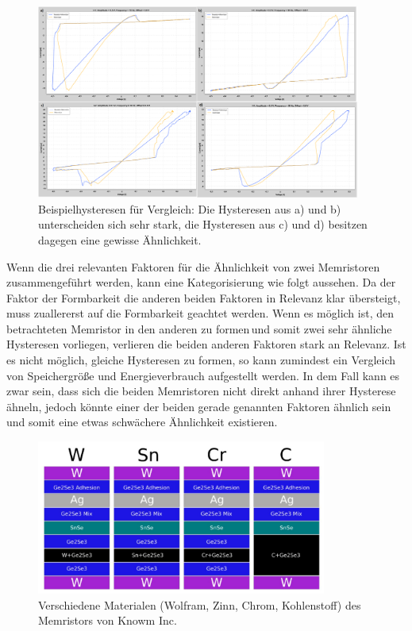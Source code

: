 \begin{figure}
  \centering
  \includegraphics[width=0.95\textwidth]{images/Hysteresen_Vergleich}
  \caption{Beispielhysteresen für Vergleich: Die Hysteresen aus a) und b) unterscheiden sich sehr stark, die Hysteresen aus c) und d) besitzen dagegen eine gewisse Ähnlichkeit.}
  \label{fig:Hysteresenvergleich}
\end{figure}
Wenn die drei relevanten Faktoren für die Ähnlichkeit von zwei Memristoren zusammengeführt werden, kann eine Kategorisierung wie folgt aussehen. Da der Faktor der Formbarkeit die anderen beiden Faktoren in Relevanz klar übersteigt, muss zuallererst auf die Formbarkeit geachtet werden. Wenn es möglich ist, den betrachteten Memristor in den anderen zu \glqq formen\grqq\,und somit zwei sehr ähnliche Hysteresen vorliegen, verlieren die beiden anderen Faktoren stark an Relevanz. Ist es nicht möglich, gleiche Hysteresen zu formen, so kann zumindest ein Vergleich von Speichergröße und Energieverbrauch aufgestellt werden. In dem Fall kann es zwar sein, dass sich die beiden Memristoren nicht direkt anhand ihrer Hysterese ähneln, jedoch könnte einer der beiden gerade genannten Faktoren ähnlich sein und somit eine etwas schwächere Ähnlichkeit existieren.

\begin{figure}
  \centering
  \includegraphics[width=0.85\textwidth]{images/Materialien.jpg}
  \caption{Verschiedene Materialen (Wolfram, Zinn, Chrom, Kohlenstoff) des Memristors von Knowm Inc.}
  \label{fig:mem_materialien}
\end{figure}

